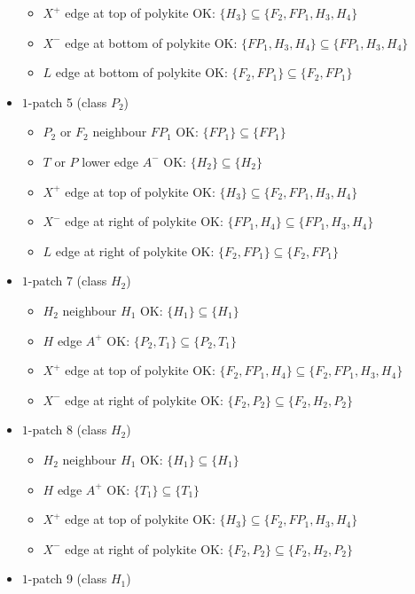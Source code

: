 \begin{itemize}
\begin{itemize}
\item $X^+$ edge at top of polykite OK: $\{H_3\} \subseteq \{F_2, FP_1, H_3, H_4\}$
\item $X^-$ edge at bottom of polykite OK: $\{FP_1, H_3, H_4\} \subseteq \{FP_1, H_3, H_4\}$
\item $L$ edge at bottom of polykite OK: $\{F_2, FP_1\} \subseteq \{F_2, FP_1\}$
\end{itemize}
\item $1$-patch 5 (class $P_2$)
\begin{itemize}
\item $P_2$ or $F_2$ neighbour $FP_1$ OK: $\{FP_1\} \subseteq \{FP_1\}$
\item $T$ or $P$ lower edge $A^-$ OK: $\{H_2\} \subseteq \{H_2\}$
\item $X^+$ edge at top of polykite OK: $\{H_3\} \subseteq \{F_2, FP_1, H_3, H_4\}$
\item $X^-$ edge at right of polykite OK: $\{FP_1, H_4\} \subseteq \{FP_1, H_3, H_4\}$
\item $L$ edge at right of polykite OK: $\{F_2, FP_1\} \subseteq \{F_2, FP_1\}$
\end{itemize}
\item $1$-patch 7 (class $H_2$)
\begin{itemize}
\item $H_2$ neighbour $H_1$ OK: $\{H_1\} \subseteq \{H_1\}$
\item $H$ edge $A^+$ OK: $\{P_2, T_1\} \subseteq \{P_2, T_1\}$
\item $X^+$ edge at top of polykite OK: $\{F_2, FP_1, H_4\} \subseteq \{F_2, FP_1, H_3, H_4\}$
\item $X^-$ edge at right of polykite OK: $\{F_2, P_2\} \subseteq \{F_2, H_2, P_2\}$
\end{itemize}
\item $1$-patch 8 (class $H_2$)
\begin{itemize}
\item $H_2$ neighbour $H_1$ OK: $\{H_1\} \subseteq \{H_1\}$
\item $H$ edge $A^+$ OK: $\{T_1\} \subseteq \{T_1\}$
\item $X^+$ edge at top of polykite OK: $\{H_3\} \subseteq \{F_2, FP_1, H_3, H_4\}$
\item $X^-$ edge at right of polykite OK: $\{F_2, P_2\} \subseteq \{F_2, H_2, P_2\}$
\end{itemize}
\item $1$-patch 9 (class $H_1$)
\begin{itemize}

\end{itemize}
\end{itemize}

